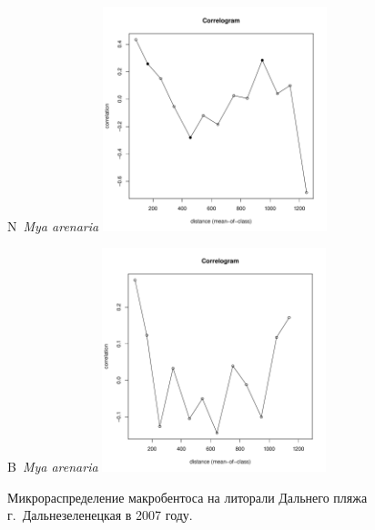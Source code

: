 \documentclass[12pt, a4paper]{disser}
\begin{document}
\begin{figure}[h]
	\begin{minipage}[b]{.46\linewidth}
	\begin{center}
	{\small N~{\it Mya arenaria}}
		\includegraphics[width=65mm]{../Barenc_Sea/distribution_Moran/Plyazh07_moran_N_Mya_arenaria_.pdf}
	\end{center}
	\end{minipage}
%
	\hfil %
%
	\begin{minipage}[b]{.46\linewidth}
	\begin{center}
	{\small B~{\it Mya arenaria}}
		\includegraphics[width=65mm]{../Barenc_Sea/distribution_Moran/Plyazh07_moran_B_Mya_arenaria_.pdf}
	\end{center}
	\end{minipage}



	\caption{Микрораспределение макробентоса на литорали Дальнего пляжа г.~Дальнезеленецкая в 2007 году.}
	\label{ris:moransI_Plyazh07_1}
	\end{figure}
\end{document}
